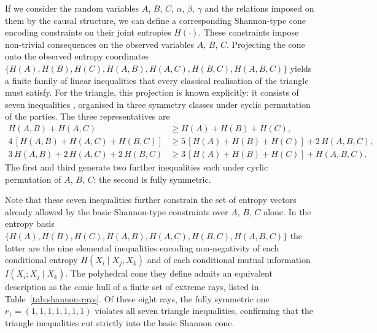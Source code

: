 \documentclass[reprint,pra, twocolumn, amsmath,amssymb,
 aps,superscriptaddress,]{revtex4-2}
\begin{document}
If we consider the random variables $A$, $B$, $C$, $\alpha$, $\beta$, $\gamma$ and the relations imposed on them by the causal structure, we can define a corresponding Shannon-type cone encoding constraints on their joint entropies $H(\cdot)$.
These constraints impose non-trivial consequences on the observed variables $A$, $B$, $C$.
Projecting the cone onto the observed entropy coordinates $\{H(A), H(B), H(C), H(A,B), H(A,C), H(B,C), H(A,B,C)\}$ yields a finite family of linear inequalities that every classical realisation of the triangle must satisfy.
For the triangle, this projection is known explicitly: it consists of seven inequalities \cite{ChavesLuftGross14}, organised in three symmetry classes under cyclic permutation of the parties.
The three representatives are
\begin{align}
    H(A,B) + H(A,C) &\geq H(A) + H(B) + H(C), \label{ineq:triangle1} \\
    4\,[H(A,B) + H(A,C) + H(B,C)] &\geq 5\,[H(A) + H(B) + H(C)] + 2\,H(A,B,C), \label{ineq:triangle2} \\
    3\,H(A,B) + 2\,H(A,C) + 2\,H(B,C) &\geq 3\,[H(A) + H(B) + H(C)] + H(A,B,C). \label{ineq:triangle3}
\end{align}
The first and third generate two further inequalities each under cyclic permutation of $A$, $B$, $C$; the second is fully symmetric.

Note that these seven inequalities further constrain the set of entropy vectors already allowed by the basic Shannon-type constraints over $A$, $B$, $C$ alone.
In the entropy basis $\{H(A), H(B), H(C), H(A,B), H(A,C), H(B,C), H(A,B,C)\}$ the latter are the nine elemental inequalities encoding non-negativity of each conditional entropy $H(X_i \mid X_j, X_k)$ and of each conditional mutual information $I(X_i ; X_j \mid X_k)$.
The polyhedral cone they define admits an equivalent description as the conic hull of a finite set of extreme rays, listed in Table~\ref{tab:shannon-rays}.
Of these eight rays, the fully symmetric one $r_1 = (1,1,1,1,1,1,1)$ violates all seven triangle inequalities, confirming that the triangle inequalities cut strictly into the basic Shannon cone.
\end{document}
